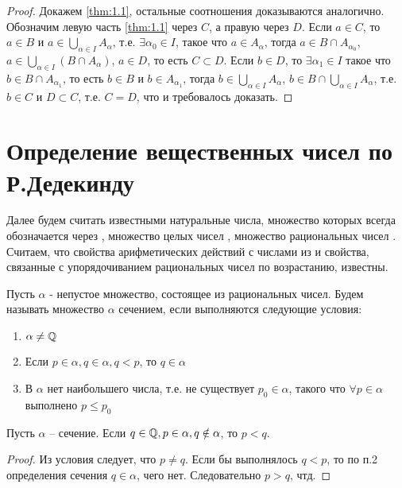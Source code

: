 \documentclass[main]{subfiles}
\begin{document}
\begin{proof}
    Докажем \eqref{thm:1.1}, остальные соотношения доказываются аналогично.
    Обозначим левую часть \eqref{thm:1.1} через $C$, а правую через $D$.
    Если $a \in C$, то $a\in B$ и $a \in \bigcup_{\alpha \in I} A_\alpha$,
    т.е. $\exists \alpha_0 \in I$, такое что $a \in A_\alpha$, тогда
    $a \in B \cap A_{\alpha_0}$, $a \in \bigcup_{\alpha \in I}(B \cap A_\alpha)$,
    $a \in D$, то есть $C \subset D$. Если $b \in D$, то $\exists \alpha_1 \in I$
    такое что $b \in B \cap A_{\alpha_1}$, то есть $b \in B$ и $b \in A_{\alpha_1}$,
    тогда $b \in \bigcup_{\alpha \in I} A_\alpha$, 
    $b \in B \cap \bigcup_{\alpha \in I} A_\alpha$, т.е. $b \in C$ и $D \subset C$,
    т.е. $C = D$, что и требовалось доказать.
\end{proof}

\section{Определение вещественных чисел по Р.Дедекинду}
Далее будем считать известными натуральные числа, множество которых всегда 
обозначается через \N, множество целых чисел \Z, множество 
рациональных чисел \Q. Считаем, что свойства арифметических действий
с числами из \Q и свойства, связанные с упорядочиванием рациональных 
чисел по возрастанию, известны.

\begin{definition}
    Пусть $\alpha$ - непустое множество, состоящее из рациональных чисел. Будем 
    называть множество $\alpha$ сечением, если выполняются следующие условия:
    \begin{enumerate}
        \item $\alpha \neq \mathbb{Q}$
        \item Если $p \in \alpha, q \in \alpha, q < p$, то $q \in \alpha$
        \item В $\alpha$ нет наибольшего числа, т.е. не существует $p_0 \in \alpha$,
    такого что $\forall p \in \alpha$ выполнено $p \leq p_0$
    \end{enumerate}
\end{definition}

\begin{assertion}
    Пусть $\alpha$ -- сечение. Если $q \in \mathbb{Q}, p \in \alpha, q \notin 
    \alpha$, то $p < q$.
\end{assertion}
\begin{proof}
    Из условия следует, что $p \neq q$. Если бы выполнялось $q < p$, то по п.2
    определения сечения $q \in \alpha$, чего нет. Следовательно $p > q$, чтд.
\end{proof}
\end{document}
